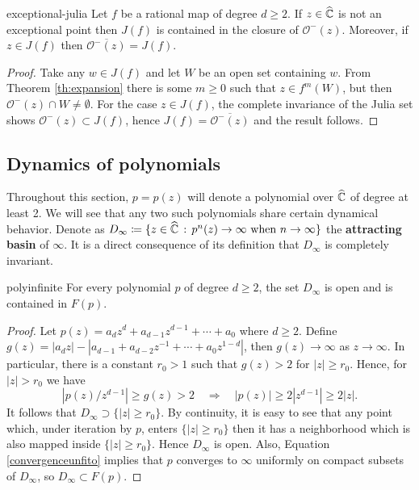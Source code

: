\begin{mytheo}{}{exceptional-julia}
Let $f$ be a rational map of degree $d\geq 2$. If $z\in \widehat{\mathbb{C}}$ is not an exceptional point then $J(f)$ is contained in the closure of $\mathcal{O}^-(z)$. Moreover, if $z\in J(f)$ then $\overline{\mathcal{O}^-(z)}=J(f)$.
\end{mytheo}

\begin{proof}
Take any $w\in J(f)$ and let $W$ be an open set containing $w$. From Theorem \ref{th:expansion} there is some $m\geq 0$ such that $z\in f^m(W)$, but then $\mathcal{O}^-(z)\cap W\neq \emptyset$. For the case $z\in J(f)$, the complete invariance of the Julia set shows $\mathcal{O}^-(z)\subset J(f)$, hence $J(f)=\overline{\mathcal{O}^-(z)}$ and the result follows.
\end{proof}

\subsection{Dynamics of polynomials}

Throughout this section, $p=p(z)$ will denote a polynomial over $\widehat{\mathbb{C}}$ of degree at least 2. We will see that any two such polynomials  share certain dynamical behavior. Denote as $D_\infty \coloneqq \{z\in \widehat{\mathbb{C}}\,:\, p^n(z) \rightarrow \infty \text{ when } n \rightarrow \infty\}$ the {\bf attracting basin} of $\infty$.  It is a direct consequence of its definition that $D_\infty$ is completely invariant.

\begin{myprop}{}{polyinfinite}
For every polynomial $p$ of degree $d \geq 2$, the set $D_\infty$ is open and is contained in $F(p)$. 
\end{myprop}

\begin{proof}
Let $p(z) = a_dz^d+a_{d-1}z^{d-1}+\cdots + a_0$ where $d\geq 2$. Define $g(z) = |a_dz|-|a_{d-1}+a_{d-2}z^{-1}+\cdots + a_0z^{1-d}|$, then $g(z)\rightarrow \infty$ as $z \rightarrow \infty$. In particular, there is a constant $r_0>1$ such that $g(z)>2$ for $|z|\geq r_0$. Hence, for $|z|>r_0$ we have
\begin{equation}\label{convergenceunfito}
|p(z)/z^{d-1}| \geq g(z)>2 \quad \Rightarrow \quad |p(z)|\geq 2|z^{d-1}|\geq 2|z|.
\end{equation}
It follows that $D_{\infty}\supset \{|z|\geq r_0\}$. By continuity, it is easy to see that any point which, under iteration by $p$, enters $\{|z|\geq r_0\}$ then it has a neighborhood which is also mapped inside $\{|z|\geq r_0\}$. Hence $D_\infty$ is open. Also, Equation \eqref{convergenceunfito} implies that $p$ converges to $\infty$ uniformly on compact subsets of $D_\infty$, so $D_\infty \subset F(p)$.
\end{proof}

